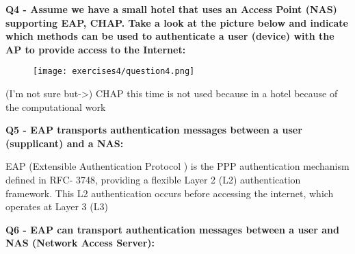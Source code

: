 \textbf{Q4 - Assume we have a small hotel that uses an Access Point (NAS) supporting EAP, CHAP. Take a look at the picture below and indicate which methods can be used to authenticate a user (device) with the AP to provide access to the Internet:}
\begin{figure}[h]
    \centering
    \texttt{[image: exercises4/question4.png]}
\end{figure}
\textcolor{Comment}{(I'm not sure but->) CHAP this time is not used because in a hotel because of the computational work }

\textbf{Q5 - EAP transports authentication messages between a user (supplicant) and a NAS:}
\textcolor{Comment}{EAP (Extensible Authentication Protocol ) is the PPP authentication mechanism defined in RFC-
3748, providing a flexible Layer 2 (L2) authentication framework. This L2 authentication
occurs before accessing the internet, which operates at Layer 3 (L3)}

\textbf{Q6 - EAP can transport authentication messages between a user and NAS (Network Access Server):}
\textcolor{Comment}{}



